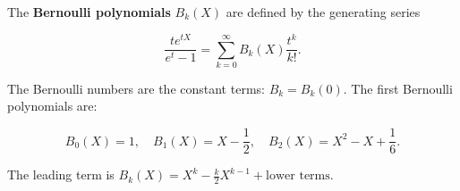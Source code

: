 The \textbf{Bernoulli polynomials} $B_k(X)$ are defined by the generating series

$$\frac{t e^{tX}}{e^t - 1} = \sum_{k=0}^{\infty} B_k(X) \frac{t^k}{k!}.$$

The Bernoulli numbers are the constant terms: $B_k = B_k(0)$. The first Bernoulli polynomials are:

$$B_0(X) = 1, \quad B_1(X) = X - \frac{1}{2}, \quad B_2(X) = X^2 - X + \frac{1}{6}.$$

The leading term is $B_k(X) = X^k - \frac{k}{2} X^{k-1} + \text{lower terms}$.
